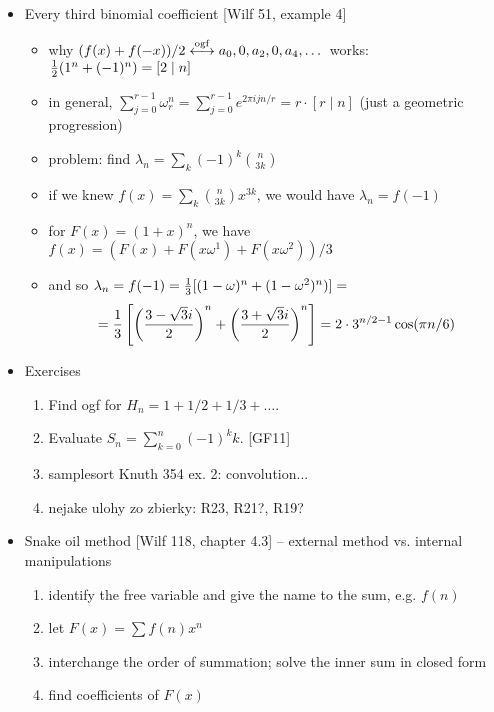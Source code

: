 \documentclass[10pt, a4paper]{article}
\def\ans#1{\big[\hskip 2mm {#1}\hskip 2mm\big]}
\def\ogf{\overset{{\rm ogf}}{\longleftrightarrow}}
\begin{document}
\begin{itemize}
\item
Every third binomial coefficient [Wilf 51, example 4]
\begin{itemize}
    \item why $(f(x)+f(-x))/2\ogf a_0, 0, a_2, 0, a_4, \dots$ works: ${1\over 2}(1^n + (-1)^n) = [2\mid n]$
    \item in general, $\sum_{j=0}^{r-1} \omega_r^n = \sum_{j=0}^{r-1} e^{2\pi ijn/r} = r\cdot [r\mid n]$ (just a geometric progression)
    \item problem: find $\lambda_n = \sum_k (-1)^k{n\choose 3k}$
    \item if we knew $f(x) = \sum_k {n\choose 3k}x^{3k}$, we would have $\lambda_n = f(-1)$
    \item for $F(x) = (1+x)^n$, we have $f(x) = (F(x) + F(x\omega^1) + F(x\omega^2))/3$
    \item and so $\lambda_n=f(-1) ={1\over 3}[(1-\omega)^n + (1-\omega^2)^n)] = $ $$ = {1\over 3}\left[\left({3-\sqrt3 i\over 2}\right)^n+\left({3+\sqrt3 i\over 2}\right)^n\right] = 2\cdot 3^{n/2-1}\cos(\pi n/6)$$ 
\end{itemize}

\item
Exercises
\begin{enumerate}
    \item Find ogf for $H_n = 1 + 1/2 + 1/3 + \dots$. \ans{$-\ln(1-x) / (1-x)$}
    \item Evaluate $S_n = \sum_{k=0}^n (-1)^kk$. [GF11]
            \ans{$f(x) = {-x\over (1+x)^2(1-x)}={1/2\over (1+x)^2} - {1/4\over 1+x} - {1/4\over 1-x}$; $S_n={1\over 4}(2(n+1)(-1)^n-(-1)^n-1)$}
    \item samplesort Knuth 354 ex. 2: convolution...
    \item nejake ulohy zo zbierky: R23, R21?, R19?
\end{enumerate}

\item
Snake oil method [Wilf 118, chapter 4.3] -- external method vs. internal manipulations
\begin{enumerate}
    \item identify the free variable and give the name to the sum, e.g. $f(n)$
    \item let $F(x) = \sum f(n)x^n$
    \item interchange the order of summation; solve the inner sum in closed form
    \item find coefficients of $F(x)$
\end{enumerate}


\end{itemize}
\end{document}
